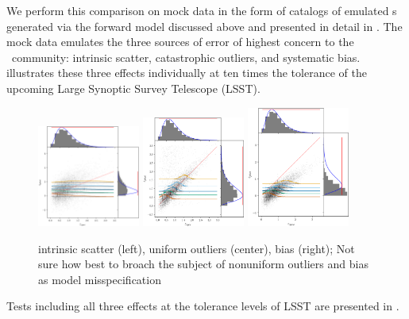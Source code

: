 We perform this comparison on mock data in the form of catalogs of emulated \pzpdf s generated via the forward model discussed above and presented in detail in .
The mock data emulates the three sources of error of highest concern to the \pz\ community: intrinsic scatter, catastrophic outliers, and systematic bias.
 illustrates these three effects individually at ten times the tolerance of the upcoming Large Synoptic Survey Telescope (LSST).
\begin{figure}
	\begin{center}
		\includegraphics[width=0.3\textwidth]{figures/chippr/hivarsigmas_scatter.png}
		\includegraphics[width=0.3\textwidth]{figures/chippr/uouthi_scatter.png}
		\includegraphics[width=0.3\textwidth]{figures/chippr/neghivarbias_scatter.png}
		\caption{intrinsic scatter (left), uniform outliers (center), bias (right);
			Not sure how best to broach the subject of nonuniform outliers and bias as model misspecification
		}
	\end{center}
\end{figure}
Tests including all three effects at the tolerance levels of LSST are presented in .

